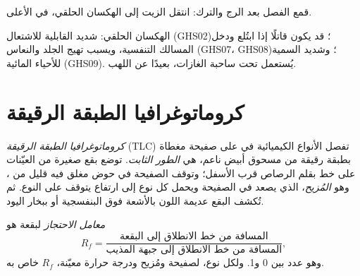 \begin{omfigure}

{\small قمع الفصل بعد الرج والترك: انتقل الزيت إلى الهكسان الحلقي، في
الأعلى.}
\end{omfigure}

\begin{safety}{}
الهكسان الحلقي: شديد القابلية للاشتعال (GHS02)؛ قد يكون قاتلًا إذا ابتُلع ودخل
المسالك التنفسية، ويسبب تهيج الجلد والنعاس (GHS07، GHS08)؛ وشديد السمية
للأحياء المائية (GHS09). يُستعمل تحت ساحبة الغازات، بعيدًا عن
اللهب.
\end{safety}

\section{كروماتوغرافيا الطبقة الرقيقة}

\begin{definition}\label{def:g10:chemical-species:tlc}
\emph{كروماتوغرافيا الطبقة الرقيقة} (TLC)
تفصل الأنواع الكيميائية في  على صفيحة مغطاة بطبقة رقيقة من مسحوق أبيض
ناعم، هي \emph{الطور الثابت}. توضع بقع صغيرة من العيّنات على
خط بقلم الرصاص قرب الأسفل؛ وتوقف الصفيحة في حوض مغلق فيه قليل من ، وهو
\emph{المُزيح}، الذي يصعد في الصفيحة ويحمل كل نوع إلى ارتفاع
يتوقف على النوع. ثم تُكشف البقع عديمة اللون بالأشعة فوق البنفسجية أو ببخار
اليود.
\end{definition}

\begin{definition}\label{def:g10:chemical-species:retention-factor}
\emph{معامل الاحتجاز} لبقعة هو
\[
  R_f = \frac{\text{المسافة من خط الانطلاق إلى البقعة}}
             {\text{المسافة من خط الانطلاق إلى جبهة المذيب}},
\]
وهو عدد بين 0 و1. ولكل نوع، لصفيحة ومُزيح ودرجة حرارة معيّنة،
$R_f$ خاص به.
\end{definition}

